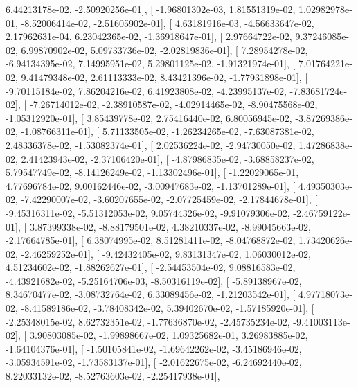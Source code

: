 \documentclass{article}
\begin{document}
          6.44213178e-02,  -2.50920256e-01],
       [ -1.96801302e-03,   1.81551319e-02,   1.02982978e-01,
         -8.52006414e-02,  -2.51605902e-01],
       [  4.63181916e-03,  -4.56633647e-02,   2.17962631e-04,
          6.23042365e-02,  -1.36918647e-01],
       [  2.97664722e-02,   9.37246085e-02,   6.99870902e-02,
          5.09733736e-02,  -2.02819836e-01],
       [  7.28954278e-02,  -6.94134395e-02,   7.14995951e-02,
          5.29801125e-02,  -1.91321974e-01],
       [  7.01764221e-02,   9.41479348e-02,   2.61113333e-02,
          8.43421396e-02,  -1.77931898e-01],
       [ -9.70115184e-02,   7.86204216e-02,   6.41923808e-02,
         -4.23995137e-02,  -7.83681724e-02],
       [ -7.26714012e-02,  -2.38910587e-02,  -4.02914465e-02,
         -8.90475568e-02,  -1.05312920e-01],
       [  3.85439778e-02,   2.75416440e-02,   6.80056945e-02,
         -3.87269386e-02,  -1.08766311e-01],
       [  5.71133505e-02,  -1.26234265e-02,  -7.63087381e-02,
          2.48336378e-02,  -1.53082374e-01],
       [  2.02536224e-02,  -2.94730050e-02,   1.47286838e-02,
          2.41423943e-02,  -2.37106420e-01],
       [ -4.87986835e-02,  -3.68858237e-02,   5.79547749e-02,
         -8.14126249e-02,  -1.13302496e-01],
       [ -1.22029065e-01,   4.77696784e-02,   9.00162446e-02,
         -3.00947683e-02,  -1.13701289e-01],
       [  4.49350303e-02,  -7.42290007e-02,  -3.60207655e-02,
         -2.07725459e-02,  -2.17844678e-01],
       [ -9.45316311e-02,  -5.51312053e-02,   9.05744326e-02,
         -9.91079306e-02,  -2.46759122e-01],
       [  3.87399338e-02,  -8.88179501e-02,   4.38210337e-02,
         -8.99045663e-02,  -2.17664785e-01],
       [  6.38074995e-02,   8.51281411e-02,  -8.04768872e-02,
          1.73420626e-02,  -2.46259252e-01],
       [ -9.42432405e-02,   9.83131347e-02,   1.06030012e-02,
          4.51234602e-02,  -1.88262627e-01],
       [ -2.54453504e-02,   9.08816583e-02,  -4.43921682e-02,
         -5.25164706e-03,  -8.50316119e-02],
       [ -5.89138967e-02,   8.34670477e-02,  -3.08732764e-02,
          6.33089456e-02,  -1.21203542e-01],
       [  4.97718073e-02,  -8.41589186e-02,  -3.78408342e-02,
          5.39402670e-02,  -1.57185920e-01],
       [ -2.25348015e-02,   8.62732351e-02,  -1.77636870e-02,
         -2.45735234e-02,  -9.41003113e-02],
       [  3.90803085e-02,  -1.99898667e-02,   1.09325682e-01,
          3.26983885e-02,  -1.64104376e-01],
       [ -1.50105841e-02,  -1.69642262e-02,  -3.45186946e-02,
         -3.05934591e-02,  -1.73583137e-01],
       [ -2.01622675e-02,  -6.24692440e-02,   8.22033132e-02,
         -8.52763603e-02,  -2.25417938e-01],
\end{document}
